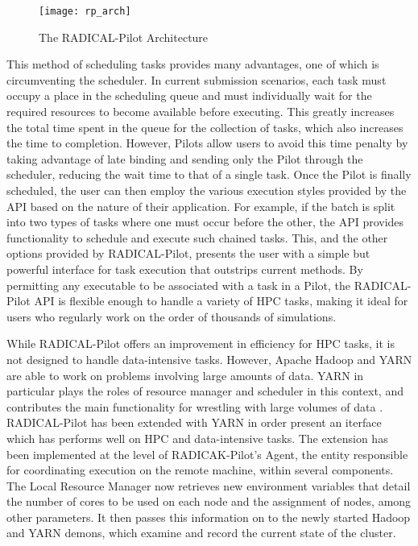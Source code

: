 \documentclass[]{article}
\begin{document}
		\begin{figure}[H]
			\centering
			\texttt{[image: rp\_arch]}
			\caption{The RADICAL-Pilot Architecture \cite{rp_arch}}
			\label{fig:rp_architecture}
		\end{figure}

		This method of scheduling tasks provides many advantages, one of which is circumventing the scheduler. In current submission scenarios, each task must occupy a place in the scheduling queue and must individually wait for the required resources to become available before executing. This greatly increases the total time spent in the queue for the collection of tasks, which also increases the time to completion. However, Pilots allow users to avoid this time penalty by taking advantage of late binding and sending only the Pilot through the scheduler, reducing the wait time to that of a single task. Once the Pilot is finally scheduled, the user can then employ the various execution styles provided by the API based on the nature of their application. For example, if the batch is split into two types of tasks where one must occur before the other, the API provides functionality to schedule and execute such chained tasks. This, and the other options provided by RADICAL-Pilot, presents the user with a simple but powerful interface for task execution that outstrips current methods. By permitting any executable to be associated with a task in a Pilot, the RADICAL-Pilot API is flexible enough to handle a variety of HPC tasks, making it ideal for users who regularly work on the order of thousands of simulations.

		While RADICAL-Pilot offers an improvement in efficiency for HPC tasks, it is not designed to handle data-intensive tasks. However, Apache Hadoop and YARN are able to work on problems involving large amounts of data. YARN in particular plays the roles of resource manager and scheduler in this context, and contributes the main functionality for wrestling with large volumes of data \cite{apache_hadoop_yarn}. RADICAL-Pilot has been extended with YARN in order present an iterface which has performs well on HPC and data-intensive tasks. The extension has been implemented at the level of RADICAK-Pilot's Agent, the entity responsible for coordinating execution on the remote machine, within several components. The Local Resource Manager now retrieves new environment variables that detail the number of cores to be used on each node and the assignment of nodes, among other parameters. It then passes this information on to the newly started Hadoop and YARN demons, which examine and record the current state of the cluster.
\end{document}
